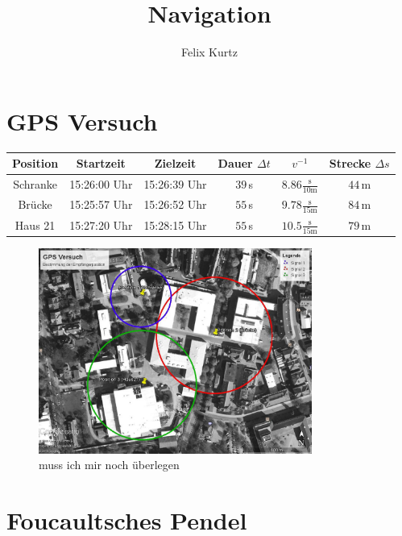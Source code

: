 \documentclass[12pt,a4paper,headinclude,bibtotoc]{scrartcl}
\begin{document}
\title{Navigation}
\author{Felix Kurtz}
\maketitle

\section{GPS Versuch}

\begin{table}[!htb]
	\centering
	\begin{tabular}{|c|c|c|c|c|c|}
		\hline		
		Position & Startzeit & Zielzeit & Dauer $\Delta t$ & $v^{-1}$ & Strecke $\Delta s$\\
		\hline
		Schranke & 15:26:00 Uhr & 15:26:39 Uhr & $39\,$s & $8.86 \frac{\si{\second}}{10\si{\meter}}$ & $44\,$m\\
		Brücke & 15:25:57 Uhr & 15:26:52 Uhr & $55\,$s & $9.78 \frac{\si{\second}}{15\si{\meter}}$ & $84\,$m\\
		Haus 21 & 15:27:20 Uhr & 15:28:15 Uhr & $55\,$s & $10.5 \frac{\si{\second}}{15\si{\meter}}$ & $79\,$m\\
		\hline
	\end{tabular}
\end{table}

\begin{figure}[!htb]
	\centering
	\includegraphics[width=0.8\textwidth]{GPS.jpg}
	\caption{muss ich mir noch überlegen}%
	\label{fig:gps}
\end{figure}

\section{Foucaultsches Pendel}
\end{document}
